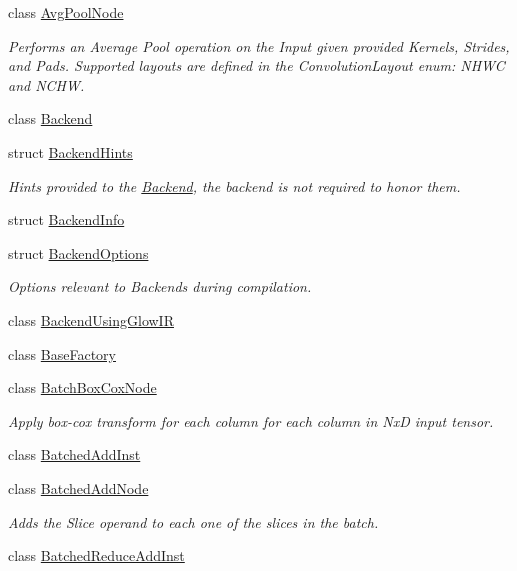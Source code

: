 \begin{DoxyCompactItemize}
class \hyperlink{classglow_1_1_avg_pool_node}{Avg\+Pool\+Node}
\begin{DoxyCompactList}\small\item\em Performs an Average Pool operation on the Input given provided Kernels, Strides, and Pads. Supported layouts are defined in the Convolution\+Layout enum\+: N\+H\+WC and N\+C\+HW. \end{DoxyCompactList}\item 
class \hyperlink{classglow_1_1_backend}{Backend}
\item 
struct \hyperlink{structglow_1_1_backend_hints}{Backend\+Hints}
\begin{DoxyCompactList}\small\item\em Hints provided to the \hyperlink{classglow_1_1_backend}{Backend}, the backend is not required to honor them. \end{DoxyCompactList}\item 
struct \hyperlink{structglow_1_1_backend_info}{Backend\+Info}
\item 
struct \hyperlink{structglow_1_1_backend_options}{Backend\+Options}
\begin{DoxyCompactList}\small\item\em Options relevant to Backends during compilation. \end{DoxyCompactList}\item 
class \hyperlink{classglow_1_1_backend_using_glow_i_r}{Backend\+Using\+Glow\+IR}
\item 
class \hyperlink{classglow_1_1_base_factory}{Base\+Factory}
\item 
class \hyperlink{classglow_1_1_batch_box_cox_node}{Batch\+Box\+Cox\+Node}
\begin{DoxyCompactList}\small\item\em Apply box-\/cox transform for each column for each column in NxD input tensor. \end{DoxyCompactList}\item 
class \hyperlink{classglow_1_1_batched_add_inst}{Batched\+Add\+Inst}
\item 
class \hyperlink{classglow_1_1_batched_add_node}{Batched\+Add\+Node}
\begin{DoxyCompactList}\small\item\em Adds the \textquotesingle{}Slice\textquotesingle{} operand to each one of the slices in the batch. \end{DoxyCompactList}\item 
class \hyperlink{classglow_1_1_batched_reduce_add_inst}{Batched\+Reduce\+Add\+Inst}

\end{DoxyCompactItemize}
